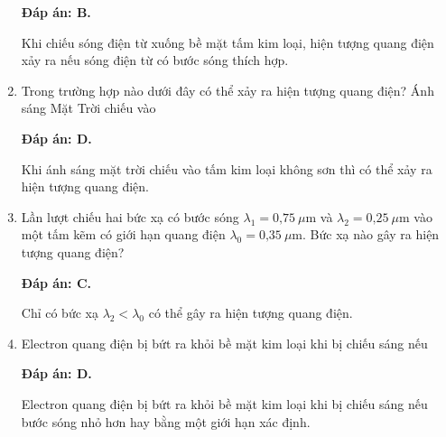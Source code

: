 \begin{enumerate}[label=\bfseries Câu \arabic*:]
	\loigiai
	{		\textbf{Đáp án: B.}
		
Khi chiếu sóng điện từ xuống bề mặt tấm kim loại, hiện tượng quang điện xảy ra nếu sóng điện từ có bước sóng thích hợp.
		
	}
	
	\item {} 
		\cauhoi
	{Trong trường hợp nào dưới đây có thể xảy ra hiện tượng quang điện? Ánh sáng Mặt Trời chiếu vào
	}
	
	\loigiai
	{		\textbf{Đáp án: D.}
		
Khi ánh sáng mặt trời chiếu vào tấm kim loại không sơn thì có thể xảy ra hiện tượng quang điện.
		
	}
	
	\item {} 
		\cauhoi
	{Lần lượt chiếu hai bức xạ có bước sóng $\lambda_1=\text{0,75}\ \mu \text{m}$ và $\lambda_2=\text{0,25}\ \mu \text{m}$ vào một tấm kẽm có giới hạn quang điện $\lambda_0=\text{0,35}\ \mu \text{m}$. Bức xạ nào gây ra hiện tượng quang điện?
	}
	
	\loigiai
	{		\textbf{Đáp án: C.}
		
Chỉ có bức xạ $ \lambda_{2} < \lambda_{0}  $ có thể gây ra hiện tượng quang điện.
		
	}
	
\item {} 
		\cauhoi
	{Electron quang điện bị bứt ra khỏi bề mặt kim loại khi bị chiếu sáng nếu
	}
	
	\loigiai
	{		\textbf{Đáp án: D.}
		
Electron quang điện bị bứt ra khỏi bề mặt kim loại khi bị chiếu sáng nếu bước sóng nhỏ hơn hay bằng một giới hạn xác định. 
		
	}
	
\end{enumerate}


